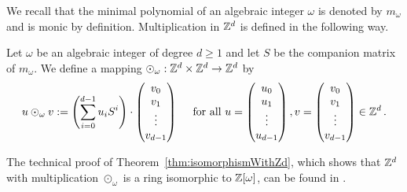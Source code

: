 We recall that the minimal polynomial of an algebraic integer $\omega$ is denoted by $m_\omega$ and is monic by definition.  
Multiplication in $\mathbb{Z}^d$ is defined in the following way.
\begin{defn}
Let $\omega$ be an algebraic integer of degree $d\geq 1$ and let $S$ be the companion matrix of $m_\omega$. We define a mapping $\odot_\omega: \mathbb{Z}^d \times \mathbb{Z}^d \rightarrow \mathbb{Z}^d$ by 
$$
u \odot_\omega v := \left(\sum_{i=0}^{d-1} {u}_i S^i\right)\cdot \begin{pmatrix} {v}_0 \\ {v}_1 \\ \vdots \\ {v}_{d-1} \end{pmatrix} \quad \text{ for all } u=\begin{pmatrix} {u}_0 \\ {u}_1 \\ \vdots \\ {u}_{d-1} \end{pmatrix}, v=\begin{pmatrix} {v}_0 \\ {v}_1 \\ \vdots \\ {v}_{d-1} \end{pmatrix} \in \mathbb{Z}^d\,.
$$ 
\end{defn}

The technical proof of Theorem~\ref{thm:isomorphismWithZd}, which shows that $\mathbb{Z}^d$ with multiplication $\odot_\omega$ is a ring isomorphic to $\mathbb{Z}[\omega]$, can be found in \cite{vu}.

